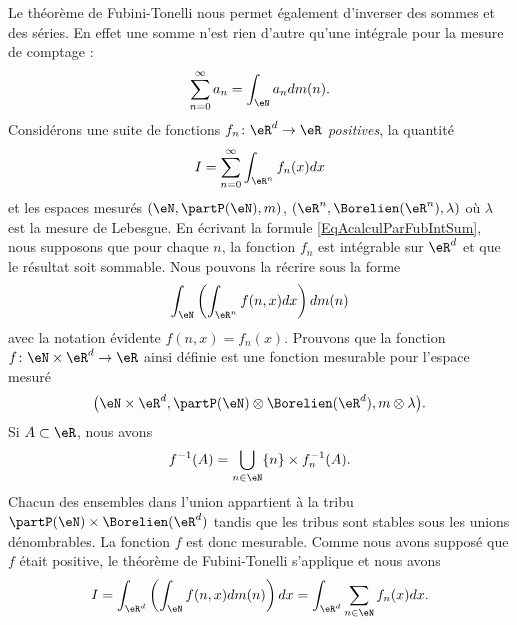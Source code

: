 \begin{example} \label{ExempInversSumIntFub}   
    Le théorème de Fubini-Tonelli nous permet également d'inverser des sommes et des séries. En effet une somme n'est rien d'autre qu'une intégrale pour la mesure de comptage :
    \begin{equation}
        \sum_{n=0}^{\infty}a_n=\int_{\eN}a_ndm(n).
    \end{equation}
    Considérons une suite de fonctions \( f_n\colon \eR^d\to \eR\) \emph{positives}, la quantité
    \begin{equation}    \label{EqAcalculParFubIntSum}
        I=\sum_{n=0}^{\infty}\int_{\eR^n}f_n(x)dx
    \end{equation}
    et les espaces mesurés \( (\eN,\partP(\eN),m)\), \( (\eR^n,\Borelien(\eR^n),\lambda)\) où \( \lambda\) est la mesure de Lebesgue. En écrivant la formule \eqref{EqAcalculParFubIntSum}, nous supposons que pour chaque \( n\), la fonction \( f_n\) est intégrable sur \( \eR^d\) et que le résultat soit sommable. Nous pouvons la récrire sous la forme
    \begin{equation}
        \int_{\eN}\left( \int_{\eR^n}f(n,x)dx \right)dm(n)
    \end{equation}
    avec la notation évidente \( f(n,x)=f_n(x)\). Prouvons que la fonction \( f\colon \eN\times\eR^d\to \eR\) ainsi définie est une fonction mesurable pour l'espace mesuré
    \begin{equation}
        \big( \eN\times\eR^d,\partP(\eN)\otimes\Borelien(\eR^d),m\otimes\lambda \big).
    \end{equation}
    Si \( A\subset\eR\), nous avons
    \begin{equation}
        f^{-1}(A)=\bigcup_{n\in\eN}\{ n \}\times f_n^{-1}(A).
    \end{equation}
    Chacun des ensembles dans l'union appartient à la tribu \( \partP(\eN)\times\Borelien(\eR^d)\) tandis que les tribus sont stables sous les unions dénombrables. La fonction \( f\) est donc mesurable. Comme nous avons supposé que \( f\) était positive, le théorème de Fubini-Tonelli s'applique et nous avons
    \begin{equation}
        I=\int_{\eR^d}\left( \int_{\eN}f(n,x)dm(n) \right)dx=\int_{\eR^d}\sum_{n\in \eN}f_n(x)dx.
    \end{equation}
\end{example}

